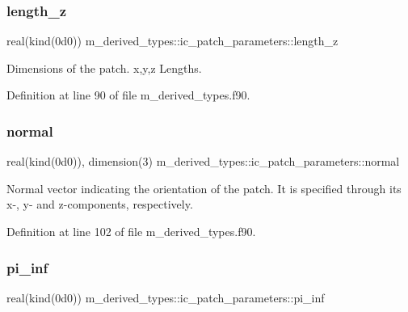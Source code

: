 \subsubsection{\texorpdfstring{length\+\_\+z}{length\_z}}
{\footnotesize\ttfamily real(kind(0d0)) m\+\_\+derived\+\_\+types\+::ic\+\_\+patch\+\_\+parameters\+::length\+\_\+z}



Dimensions of the patch. x,y,z Lengths. 



Definition at line 90 of file m\+\_\+derived\+\_\+types.\+f90.

\mbox{\label{structm__derived__types_1_1ic__patch__parameters_a04e1c26cca4a4ef9ef9f1ae54c01a61c}} 
\subsubsection{\texorpdfstring{normal}{normal}}
{\footnotesize\ttfamily real(kind(0d0)), dimension(3) m\+\_\+derived\+\_\+types\+::ic\+\_\+patch\+\_\+parameters\+::normal}



Normal vector indicating the orientation of the patch. It is specified through its x-\/, y-\/ and z-\/components, respectively. 



Definition at line 102 of file m\+\_\+derived\+\_\+types.\+f90.

\mbox{\label{structm__derived__types_1_1ic__patch__parameters_a0306de0dfe34028782b6f03a7441397a}} 
\subsubsection{\texorpdfstring{pi\+\_\+inf}{pi\_inf}}
{\footnotesize\ttfamily real(kind(0d0)) m\+\_\+derived\+\_\+types\+::ic\+\_\+patch\+\_\+parameters\+::pi\+\_\+inf}



